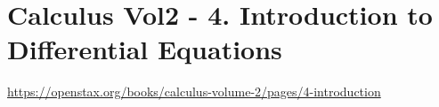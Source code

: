\section{Calculus Vol2 - 4. Introduction to Differential Equations}

\url{https://openstax.org/books/calculus-volume-2/pages/4-introduction}


\clearpage

\clearpage

\clearpage

\clearpage

\clearpage
